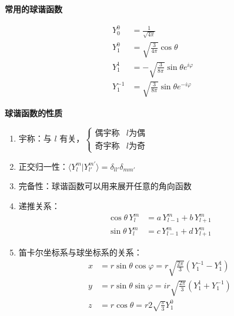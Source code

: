 \documentclass[lang=cn,10pt]{elegantbook}
\begin{document}
\textbf{常用的球谐函数}

\begin{align*}
	Y_0^0 &= \frac{1}{\sqrt{4\pi}} \\
	Y_1^0 &= \sqrt{\frac{3}{4\pi}} \cos\theta \\
	Y_1^1 &= -\sqrt{\frac{3}{8\pi}} \sin\theta e^{i\varphi} \\
	Y_1^{-1} &= \sqrt{\frac{3}{8\pi}} \sin\theta e^{-i\varphi}
\end{align*}

\textbf{球谐函数的性质}

\begin{enumerate}
	\item 宇称：与 $l$ 有关，\(\begin{cases} 
			\text{偶宇称} & l \text{为偶} \\
			\text{奇宇称} & l \text{为奇}
		\end{cases}\)
	\item 正交归一性：$\langle Y_l^m | Y_{l'}^{m'} \rangle = \delta_{ll'} \delta_{mm'}$
	\item 完备性：球谐函数可以用来展开任意的角向函数
	\item 递推关系：
	\begin{align*}
		\cos\theta \, Y_l^m &= a \, Y_{l-1}^m + b \, Y_{l+1}^m \\
		\sin\theta \, Y_l^m &= c \, Y_{l-1}^m + d \, Y_{l+1}^m
	\end{align*}
	\item 笛卡尔坐标系与球坐标系的关系：
	\begin{align*}
		x &= r \sin\theta \cos\varphi = r \sqrt{\frac{2\pi}{3}} (Y_1^{-1} - Y_1^1) \\
		y &= r \sin\theta \sin\varphi = ir \sqrt{\frac{2\pi}{3}} (Y_1^1 + Y_1^{-1}) \\
		z &= r \cos\theta = r 2 \sqrt{\frac{\pi}{3}} Y_1^0
	\end{align*}
\end{enumerate}
\end{document}
